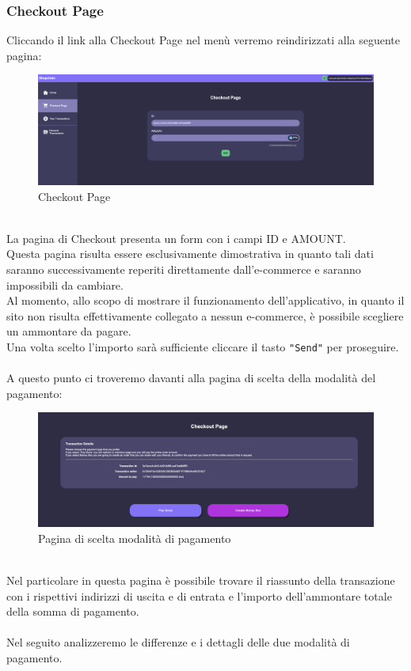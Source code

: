         \subsubsection{Checkout Page}
        Cliccando il link alla Checkout Page nel menù verremo reindirizzati alla seguente pagina:
        \begin{figure}[H]
            \centering
            \includegraphics[scale=0.2]{immagini/Checkout/Checkout.png}
            \caption{Checkout Page}
        \end{figure}
        \textbf{}\\
        La pagina di Checkout presenta un form con i campi ID e AMOUNT.\\
        Questa pagina risulta essere esclusivamente dimostrativa in quanto tali dati saranno successivamente reperiti direttamente dall'e-commerce\glo{} e saranno impossibili da cambiare.\\
        Al momento, allo scopo di mostrare il funzionamento dell'applicativo, in quanto il sito non risulta effettivamente collegato a nessun e-commerce\glo{}, è possibile scegliere un ammontare da pagare. \\
        Una volta scelto l'importo sarà sufficiente cliccare il tasto \texttt{"Send"} per proseguire.\\\\
        A questo punto ci troveremo davanti alla pagina di scelta della modalità del pagamento:
        \begin{figure}[H]
            \centering
            \includegraphics[scale=0.2]{immagini/Checkout/PaymentMode.png}
            \caption{Pagina di scelta modalità di pagamento}
        \end{figure}
        \textbf{}\\
        Nel particolare in questa pagina è possibile trovare il riassunto della transazione con i rispettivi indirizzi di uscita e di entrata e l'importo dell'ammontare totale della somma di pagamento.\\\\
        Nel seguito analizzeremo le differenze e i dettagli delle due modalità di pagamento.
